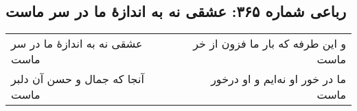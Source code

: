 \begin{center}
\section*{رباعی شماره ۳۶۵: عشقی نه به اندازهٔ ما در سر ماست}
\label{sec:0365}
\begin{longtable}{l p{0.5cm} r}
عشقی نه به اندازهٔ ما در سر ماست
&&
و این طرفه که بار ما فزون از خر ماست
\\
آنجا که جمال و حسن آن دلبر ماست
&&
ما در خور او نه‌ایم و او درخور ماست
\\
\end{longtable}
\end{center}
